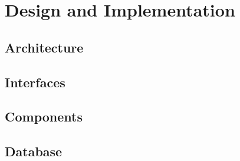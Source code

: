 \chapter{Design and Implementation}\label{part:design}

\section{Architecture}
 
\section{Interfaces}
 
\section{Components}
 
\section{Database}
